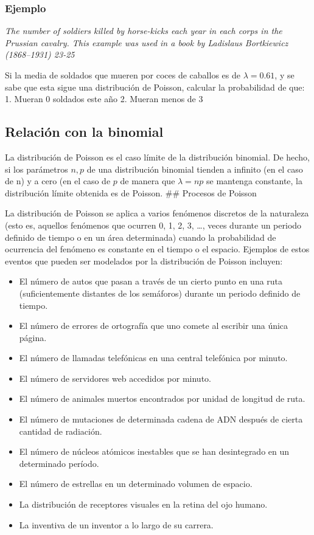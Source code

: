 \documentclass[]{book}
\providecommand{\tightlist}{%
  \setlength{\itemsep}{0pt}\setlength{\parskip}{0pt}}
\theoremstyle{plain}
\theoremstyle{definition}
\theoremstyle{definition} %
\begin{document}
\hypertarget{ejemplo-8}{%
\subsubsection{Ejemplo}\label{ejemplo-8}}

\emph{The number of soldiers killed by horse-kicks each year in each
corps in the Prussian cavalry. This example was used in a book by
Ladislaus Bortkiewicz (1868--1931) 23-25}

Si la media de soldados que mueren por coces de caballos es de
\(\lambda = 0.61\), y se sabe que esta sigue una distribución de
Poisson, calcular la probabilidad de que: 1. Mueran 0 soldados este año
2. Mueran menos de 3

\hypertarget{relaciuxf3n-con-la-binomial}{%
\subsection{Relación con la
binomial}\label{relaciuxf3n-con-la-binomial}}

La distribución de Poisson es el caso límite de la distribución
binomial. De hecho, si los parámetros \(n, p\) de una distribución
binomial tienden a infinito (en el caso de n) y a cero (en el caso de
\(p\) de manera que \(\lambda = np\) se mantenga constante, la
distribución límite obtenida es de Poisson. \#\# Procesos de Poisson

La distribución de Poisson se aplica a varios fenómenos discretos de la
naturaleza (esto es, aquellos fenómenos que ocurren 0, 1, 2, 3,
\ldots{}, veces durante un periodo definido de tiempo o en un área
determinada) cuando la probabilidad de ocurrencia del fenómeno es
constante en el tiempo o el espacio. Ejemplos de estos eventos que
pueden ser modelados por la distribución de Poisson incluyen:

\begin{itemize}
\tightlist
\item
  El número de autos que pasan a través de un cierto punto en una ruta
  (suficientemente distantes de los semáforos) durante un periodo
  definido de tiempo.
\item
  El número de errores de ortografía que uno comete al escribir una
  única página.
\item
  El número de llamadas telefónicas en una central telefónica por
  minuto.
\item
  El número de servidores web accedidos por minuto.
\item
  El número de animales muertos encontrados por unidad de longitud de
  ruta.
\item
  El número de mutaciones de determinada cadena de ADN después de cierta
  cantidad de radiación.
\item
  El número de núcleos atómicos inestables que se han desintegrado en un
  determinado período.
\item
  El número de estrellas en un determinado volumen de espacio.
\item
  La distribución de receptores visuales en la retina del ojo humano.
\item
  La inventiva de un inventor a lo largo de su carrera.
\end{itemize}
\end{document}
